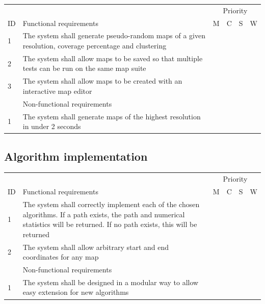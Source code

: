 \documentclass[12pt,notitlepage]{report}
\begin{document}
\begin{center}
        \begin{tabular}{@{}l p{10cm} cccc} \toprule
\multicolumn{2}{r}{~} &\multicolumn{4}{c}{Priority} \\ 
\cmidrule(l){3-6}
ID & Functional requirements & M & C & S & W  \\ \midrule
    1 & The system shall generate pseudo-random maps of a given resolution, coverage percentage and clustering & \cellcolor{green!60} & ~ & ~ & ~\\
    2 & The system shall allow maps to be saved so that multiple tests can be run on the same map suite & \cellcolor{green!60} & ~ & ~ & ~\\
    3 & The system shall allow maps to be created with an interactive map editor & ~ & ~ & \cellcolor{orange!60} & ~\\
    \midrule
    ~ & Non-functional requirements & \multicolumn{4}{r}{}  \\ \midrule
    1 & The system shall generate maps of the highest resolution in under 2 seconds & ~ & \cellcolor{yellow!80} & ~ & ~ \\  \bottomrule
\end{tabular}
\end{center}
	
\subsection{Algorithm implementation}

\begin{center}
    \begin{tabular}{@{}l p{10cm} cccc} \toprule
\multicolumn{2}{r}{~} &\multicolumn{4}{c}{Priority} \\ 
\cmidrule(l){3-6}
ID & Functional requirements & M & C & S & W  \\ \midrule
1 & The system shall correctly implement each of the chosen algorithms. If a path exists, the path and numerical statistics will be returned. If no path exists, this will be returned & \cellcolor{green!60} & ~ & ~ & ~\\
    2 & The system shall allow arbitrary start and end coordinates for any map & ~ & \cellcolor{yellow!80} & ~ & ~ \\ 
    \midrule
    ~ & Non-functional requirements & \multicolumn{4}{r}{}  \\ \midrule
    1 & The system shall be designed in a modular way to allow easy extension for new algorithms & ~ & \cellcolor{yellow!80} & ~ & ~ \\  \bottomrule
\end{tabular}
\end{center}
\end{document}
